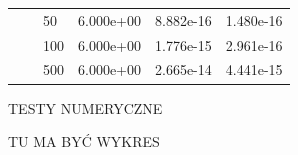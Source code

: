 \documentclass[9pt]{beamer}
\begin{document}
\begin{frame}
\begin{table}[]
{\begin{tabular}{|l|S|l|S|S|S|}
                &   & 50    & 6.000e+00   & 8.882e-16   & 1.480e-16 \\
                &   & 100   & 6.000e+00   & 1.776e-15   & 2.961e-16 \\
                &   & 500   & 6.000e+00   & 2.665e-14   & 4.441e-15 \\
                \hline

            \end{tabular}

        }
    \end{table}

\end{frame}

\begin{frame}
    TESTY NUMERYCZNE
\end{frame}


\begin{frame}
    TU MA BYĆ WYKRES
\end{frame}
\end{document}
